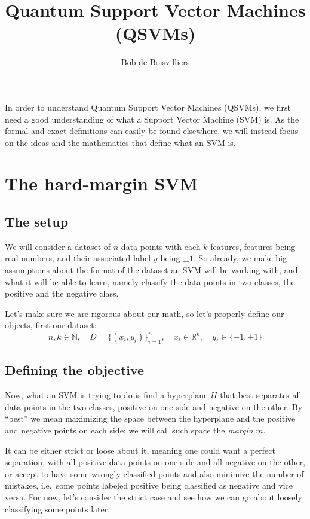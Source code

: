 \documentclass[12pt,a4paper]{article}
\title{Quantum Support Vector Machines (QSVMs)}
\author{Bob de Boisvilliers}
\begin{document}
\maketitle

In order to understand Quantum Support Vector Machines (QSVMs), we first need a good understanding of what a Support Vector Machine (SVM) is. As the formal and exact definitions can easily be found elsewhere, we will instead focus on the ideas and the mathematics that define what an SVM is.

\section{The hard-margin SVM}

\subsection{The setup}

We will consider a dataset of $n$ data points with each $k$ features, features being real numbers, and their associated label $y$ being $\pm 1$. So already, we make big assumptions about the format of the dataset an SVM will be working with, and what it will be able to learn, namely classify the data points in two classes, the positive and the negative class.

Let's make sure we are rigorous about our math, so let's properly define our objects, first our dataset:
\[
n, k \in \mathbb{N}, \quad D = \{(x_i, y_i)\}_{i=1}^{n}, \quad x_i \in \mathbb{R}^k, \quad y_i \in \{-1, +1\}
\]

\subsection{Defining the objective}

Now, what an SVM is trying to do is find a hyperplane $H$ that best separates all data points in the two classes, positive on one side and negative on the other. By ``best'' we mean maximizing the space between the hyperplane and the positive and negative points on each side; we will call such space the \emph{margin} $m$.

It can be either strict or loose about it, meaning one could want a perfect separation, with all positive data points on one side and all negative on the other, or accept to have some wrongly classified points and also minimize the number of mistakes, i.e.\ some points labeled positive being classified as negative and vice versa. For now, let's consider the strict case and see how we can go about loosely classifying some points later.
\end{document}
